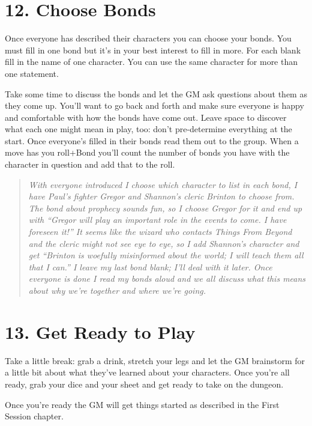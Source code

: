 \section*{12. Choose Bonds}

Once everyone has described their characters you can choose your bonds. You must fill in one bond but it's in your best interest to fill in more. For each blank fill in the name of one character. You can use the same character for more than one statement.

Take some time to discuss the bonds and let the GM ask questions about them as they come up. You'll want to go back and forth and make sure everyone is happy and comfortable with how the bonds have come out. Leave space to discover what each one might mean in play, too: don't pre-determine everything at the start. Once everyone's filled in their bonds read them out to the group. When a move has you roll+Bond you'll count the number of bonds you have with the character in question and add that to the roll.

\begin{quote}
\emph{With everyone introduced I choose which character to list in each bond, I have Paul's fighter Gregor and Shannon's cleric Brinton to choose from. The bond about prophecy sounds fun, so I choose Gregor for it and end up with ``Gregor will play an important role in the events to come. I have foreseen it!'' It seems like the wizard who contacts Things From Beyond and the cleric might not see eye to eye, so I add Shannon's character and get ``Brinton is woefully misinformed about the world; I will teach them all that I can.'' I leave my last bond blank; I'll deal with it later. Once everyone is done I read my bonds aloud and we all discuss what this means about why we're together and where we're going.}
\end{quote}
\section*{13. Get Ready to Play}

Take a little break: grab a drink, stretch your legs and let the GM brainstorm for a little bit about what they've learned about your characters. Once you're all ready, grab your dice and your sheet and get ready to take on the dungeon.

Once you're ready the GM will get things started as described in the First Session chapter.

